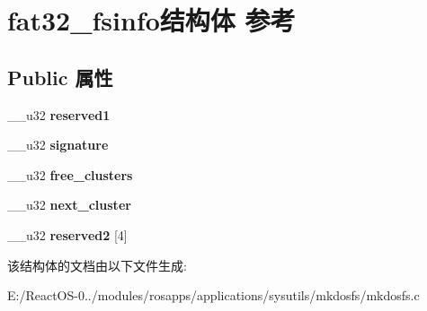 \hypertarget{structfat32__fsinfo}{}\section{fat32\+\_\+fsinfo结构体 参考}
\label{structfat32__fsinfo}
\subsection*{Public 属性}
\begin{DoxyCompactItemize}
\item 
\mbox{\label{structfat32__fsinfo_a959c5abd6f03a22908b8f30082b81cb8}} 
\+\_\+\+\_\+u32 {\bfseries reserved1}
\item 
\mbox{\label{structfat32__fsinfo_a2925e0363f47ebadd21b14b55692f5d4}} 
\+\_\+\+\_\+u32 {\bfseries signature}
\item 
\mbox{\label{structfat32__fsinfo_a2f345a51f3990375cd7500e4a2ef15df}} 
\+\_\+\+\_\+u32 {\bfseries free\+\_\+clusters}
\item 
\mbox{\label{structfat32__fsinfo_a070401ce4127b185013fe51d11a2fd73}} 
\+\_\+\+\_\+u32 {\bfseries next\+\_\+cluster}
\item 
\mbox{\label{structfat32__fsinfo_aa692e3f7d98c0fc8aada138e2c605a79}} 
\+\_\+\+\_\+u32 {\bfseries reserved2} \mbox{[}4\mbox{]}
\end{DoxyCompactItemize}


该结构体的文档由以下文件生成\+:\begin{DoxyCompactItemize}
\item 
E\+:/\+React\+O\+S-\/0../modules/rosapps/applications/sysutils/mkdosfs/mkdosfs.\+c\end{DoxyCompactItemize}
